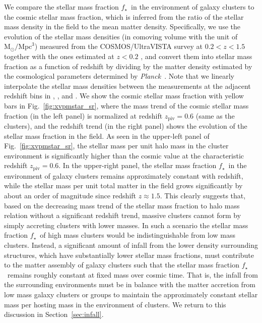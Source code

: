 \documentclass[useAMS,usenatbib,iop,numberedappendix]{mn2e}
\newcommand{\Msun}{\ensuremath{\mathrm{M}_{\odot}}}
\newcommand{\redshift}{\ensuremath{z}}
\newcommand{\PLANCK}{\emph{Planck}}
\newcommand{\ZPIV}{\ensuremath{z_{\mathrm{piv}}}}
\newcommand{\fstar}{\ensuremath{f_{\star}}}
\begin{document}
We compare the stellar mass fraction \fstar\ in the environment of galaxy clusters to the cosmic stellar mass fraction, which is inferred from the ratio of the stellar mass density in the field to the mean matter density.
Specifically, we use the evolution of the stellar mass densities (in comoving volume with the unit of $\Msun/\mathrm{Mpc}^3$) measured from the COSMOS/UltraVISTA survey \citep{muzzin13} at $0.2<\redshift<1.5$ together with the ones estimated at $\redshift<0.2$ \citep[from][]{cole01,bell03,baldry12}, and convert them into stellar mass fraction as a function of redshift by dividing by the matter density estimated by the cosmological parameters determined by \PLANCK\  \citep{planck16cosmological}.
Note that we linearly interpolate the stellar mass densities between the measurements at the adjacent redshift bins in \cite{cole01}, \cite{bell03}, \cite{baldry12} and \cite{muzzin13}.
We show the cosmic stellar mass fraction with yellow bars in Fig.~\ref{fig:xvpmstar_sr}, where the mass trend of the cosmic stellar mass fraction (in the left panel) is normalized at redshift $\ZPIV=0.6$ (same as the clusters), and the redshift trend (in the right panel) shows the evolution of the stellar mass fraction in the field.
As seen in the upper-left panel of Fig.~\ref{fig:xvpmstar_sr}, the stellar mass per unit halo mass in the cluster environment is significantly higher than the cosmic value at the characteristic redshift $\ZPIV=0.6$.
In the upper-right panel, the stellar mass fraction \fstar\ in the environment of galaxy clusters remains approximately constant with redshift, while the stellar mass per unit total matter in the field grows significantly by about an order of magnitude since redshift $\redshift\approx1.5$.
This clearly suggests that, based on the decreasing mass trend of the stellar mass fraction to halo mass relation without a significant redshift trend, massive clusters cannot form by simply accreting clusters with lower masses.   In such a scenario the stellar mass fraction \fstar\ of high mass clusters would be indistinguishable from low mass clusters.
Instead, a significant amount of infall from the lower density 
surrounding structures, which have substantially lower stellar mass fractions, must
contribute to the matter assembly of galaxy clusters such that the stellar mass fraction \fstar\ remains roughly constant 
at fixed mass over cosmic time.
That is, the infall from the surrounding environments must be in balance with the matter accretion from low mass galaxy clusters or groups to maintain the approximately constant stellar mass per hosting mass in the environment of clusters.
We return to this discussion in Section~\ref{sec:infall}. 
\end{document}
